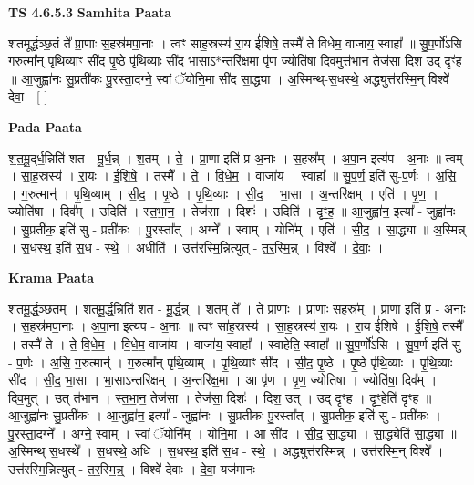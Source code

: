 \documentclass[17pt]{extarticle}
\begin{document}
\textbf{TS 4.6.5.3 } \newline
\textbf{Samhita Paata} \newline

शतमूर्द्धञ्छ॒तं ते᳚ प्रा॒णाः स॒हस्र॑मपा॒नाः । त्वꣳ सा॑ह॒स्रस्य॑ रा॒य ई॑शिषे॒ तस्मै॑ ते विधेम॒ वाजा॑य॒ स्वाहा᳚ ॥ सु॒प॒र्णो॑ऽसि ग॒रुत्मा᳚न् पृथि॒व्याꣳ सी॑द पृ॒ष्ठे पृ॑थि॒व्याः सी॑द भा॒साऽ*न्तरि॑क्ष॒मा पृ॑ण॒ ज्योति॑षा॒ दिव॒मुत्त॑भान॒ तेज॑सा॒ दिश॒ उद् दृꣳ॑ह ॥ आ॒जुह्वा॑नः सु॒प्रती॑कः पु॒रस्ता॒दग्ने॒ स्वां ॅयोनि॒मा सी॑द सा॒द्ध्या । अ॒स्मिन्थ्-स॒धस्थे॒ अद्ध्युत्त॑रस्मि॒न् विश्वे॑ देवा॒ - [  ] \newline

\textbf{Pada Paata} \newline

श॒त॒मू॒द्‌र्ध॒न्निति॑ शत - मू॒र्ध॒न्न् । श॒तम् । ते॒ । प्रा॒णा इति॑ प्र-अ॒नाः । स॒हस्र᳚म् । अ॒पा॒न इत्य॑प - अ॒नाः ॥ त्वम् । सा॒ह॒स्रस्य॑ । रा॒यः । ई॒शि॒षे॒ । तस्मै᳚ । ते॒ । वि॒धे॒म॒ । वाजा॑य । स्वाहा᳚ ॥ सु॒प॒र्ण॒ इति॑ सु-प॒र्णः । अ॒सि॒ । ग॒रुत्मान्॑ । पृ॒थि॒व्याम् । सी॒द॒ । पृ॒ष्ठे । पृ॒थि॒व्याः । सी॒द॒ । भा॒सा । अ॒न्तरि॑क्षम् । एति॑ । पृ॒ण॒ । ज्योति॑षा । दिव᳚म् । उदिति॑ । स्त॒भा॒न॒ । तेज॑सा । दिशः॑ । उदिति॑ । दृꣳ॒॒ह॒ ॥ आ॒जुह्वा॑न॒ इत्या᳚ - जुह्वा॑नः । सु॒प्रती॑क॒ इति॑ सु - प्रती॑कः । पु॒रस्ता᳚त् । अग्ने᳚ । स्वाम् । योनि᳚म् । एति॑ । सी॒द॒ । सा॒द्ध्या ॥ अ॒स्मिन्न् । स॒धस्थ॒ इति॑ स॒ध - स्थे॒ । अधीति॑ । उत्त॑रस्मि॒न्नित्युत् - त॒र॒स्मि॒न्न् । विश्वे᳚ । दे॒वाः॒ ।  \newline


\textbf{Krama Paata} \newline

श॒त॒मू॒र्द्ध॒ञ्छ॒तम् । श॒त॒मू॒र्द्ध॒न्निति॑ शत - मू॒र्द्ध॒न्न्॒ । श॒तम् ते᳚ । ते॒ प्रा॒णाः । प्रा॒णाः स॒हस्र᳚म् । प्रा॒णा इति॑ प्र - अ॒नाः । स॒हस्र॑मपा॒नाः । अ॒पा॒ना इत्य॑प - अ॒नाः ॥ त्वꣳ सा॑ह॒स्रस्य॑ । सा॒ह॒स्रस्य॑ रा॒यः । रा॒य ई॑शिषे । ई॒शि॒षे॒ तस्मै᳚ । तस्मै॑ ते । ते॒ वि॒धे॒म॒ । वि॒धे॒म॒ वाजा॑य । वाजा॑य॒ स्वाहा᳚ । स्वाहेति॒ स्वाहा᳚ ॥ सु॒प॒र्णो॑ऽसि । सु॒प॒र्ण इति॑ सु - प॒र्णः । अ॒सि॒ ग॒रुत्मान्॑ । ग॒रुत्मा᳚न् पृथि॒व्याम् । पृ॒थि॒व्याꣳ सी॑द । सी॒द॒ पृ॒ष्ठे । पृ॒ष्ठे पृ॑थि॒व्याः । पृ॒थि॒व्याः सी॑द । सी॒द॒ भा॒सा । भा॒साऽन्तरि॑क्षम् । अ॒न्तरि॑क्ष॒मा । आ पृ॑ण । पृ॒ण॒ ज्योति॑षा । ज्योति॑षा॒ दिव᳚म् । दिव॒मुत् । उत् त॑भान । स्त॒भा॒न॒ तेज॑सा । तेज॑सा॒ दिशः॑ । दिश॒ उत् । उद् दृꣳ॑ह । दृꣳ॒॒हेति॑ दृꣳह ॥ आ॒जुह्वा॑नः सु॒प्रती॑कः । आ॒जुह्वा॑न॒ इत्या᳚ - जुह्वा॑नः । सु॒प्रती॑कः पु॒रस्ता᳚त् । सु॒प्रती॑क॒ इति॑ सु - प्रती॑कः । पु॒रस्ता॒दग्ने᳚ । अग्ने॒ स्वाम् । स्वां ॅयोनि᳚म् । योनि॒मा । आ सी॑द । सी॒द॒ सा॒द्ध्या । सा॒द्ध्येति॑ सा॒द्ध्या ॥ अ॒स्मिन्थ् स॒धस्थे᳚ । स॒धस्थे॒ अधि॑ । स॒धस्थ॒ इति॑ स॒ध - स्थे॒ । अद्ध्युत्त॑रस्मिन्न् । उत्त॑रस्मि॒न् विश्वे᳚ । उत्त॑रस्मि॒न्नित्युत् - त॒र॒स्मि॒न्न्॒ । विश्वे॑ देवाः । दे॒वा॒ यज॑मानः \newline
\end{document}

